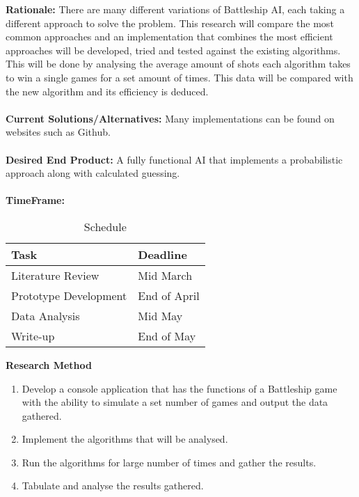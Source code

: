 \documentclass[paper=a4, fontsize=11pt]{scrartcl}
\numberwithin{equation}{section} %
\numberwithin{figure}{section} %
\numberwithin{table}{section} %
\begin{document}
\textbf{Rationale:} There are many different variations of Battleship AI, each taking a different approach to solve the problem. This research will compare the most common approaches and an implementation that combines the most efficient approaches will be developed, tried and tested against the existing algorithms. This will be done by analysing the average amount of shots each algorithm takes to win a single games for a set amount of times. This data will be compared with the new algorithm and its efficiency is deduced.\\\\
\textbf{Current Solutions/Alternatives:} Many implementations can be found on websites such as Github.\\\\
\textbf{Desired End Product:} A fully functional AI that implements a probabilistic approach along with calculated guessing. \\\\
\textbf{TimeFrame:}
\begin{table}[h]
    \begin{tabular}{l|l}
    \textbf{Task}                  & \textbf{Deadline}     \\ \hline
    Literature Review     & Mid March    \\
    Prototype Development & End of April \\
    Data Analysis         & Mid May \\
    Write-up              & End of May   \\
    \end{tabular}
    \centering
    \label{tab:schedule}
    \caption{Schedule}
\end{table}

\textbf{Research Method} 
\begin{enumerate}
	\item Develop a console application that has the functions of a Battleship game with the ability to simulate a set number of games and output the data gathered.
	\item Implement the algorithms that will be analysed. 
	\item Run the algorithms for large number of times and gather the results.
	\item Tabulate and analyse the results gathered.
\end{enumerate}
\end{document}
